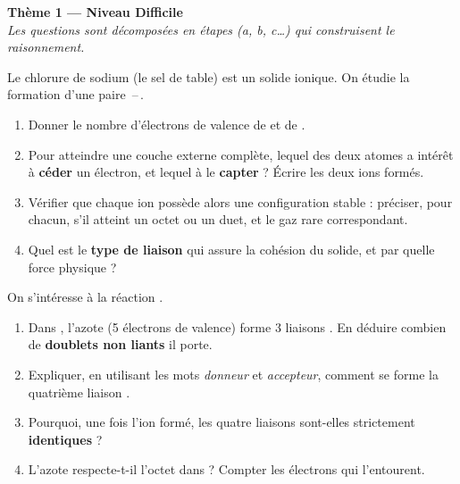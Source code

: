\documentclass[11pt,a4paper]{article}
\begin{document}
\begin{center}
{\Large\bfseries\color{primarydark}Thème 1 — Niveau Difficile}\\[2pt]
{\small\itshape Les questions sont décomposées en étapes (a, b, c\ldots) qui construisent le raisonnement.}
\end{center}
\medskip

\begin{exo}
Le chlorure de sodium  (le sel de table) est un solide ionique. On étudie la formation
d'une paire \,--\,.
\begin{enumerate}[label=\alph*),leftmargin=2em,itemsep=2pt]
  \item Donner le nombre d'électrons de valence de  et de .
  \item Pour atteindre une couche externe complète, lequel des deux atomes a intérêt à
        \textbf{céder} un électron, et lequel à le \textbf{capter} ? Écrire les deux ions formés.
  \item Vérifier que chaque ion possède alors une configuration stable : préciser, pour chacun,
        s'il atteint un octet ou un duet, et le gaz rare correspondant.
  \item Quel est le \textbf{type de liaison} qui assure la cohésion du solide, et par quelle force
        physique ?
\end{enumerate}
\end{exo}

\begin{exo}
On s'intéresse à la réaction .
\begin{enumerate}[label=\alph*),leftmargin=2em,itemsep=2pt]
  \item Dans , l'azote (5 électrons de valence) forme 3 liaisons . En déduire
        combien de \textbf{doublets non liants} il porte.
  \item Expliquer, en utilisant les mots \emph{donneur} et \emph{accepteur}, comment se forme la
        quatrième liaison .
  \item Pourquoi, une fois l'ion  formé, les quatre liaisons  sont-elles
        strictement \textbf{identiques} ?
  \item L'azote respecte-t-il l'octet dans  ? Compter les électrons qui l'entourent.
\end{enumerate}
\end{exo}
\end{document}
